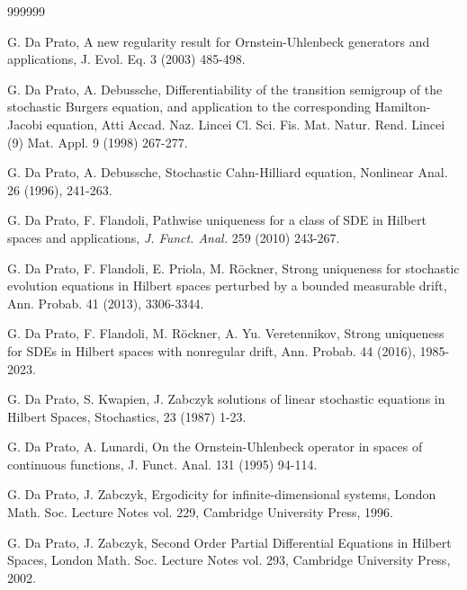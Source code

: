 \documentclass[preprint]{imsart}
\begin{document}
\begin{thebibliography}  {999999}
{%
 

 G. Da Prato, A new regularity result for Ornstein-Uhlenbeck generators and applications, J. Evol. Eq. 3 (2003) 485-498. 


 {  G. Da Prato, A. Debussche,
Differentiability of the transition semigroup of the stochastic Burgers equation, and application to the corresponding Hamilton-Jacobi equation,
 Atti Accad. Naz. Lincei Cl. Sci. Fis. Mat. Natur. Rend. Lincei (9) Mat. Appl. 9 (1998)  267-277.}


 G. Da Prato, A. Debussche, Stochastic Cahn-Hilliard equation, Nonlinear Anal.
26 (1996), 241-263.



 G. Da Prato, F. Flandoli, Pathwise uniqueness for a class of SDE 
in
Hilbert spaces and applications, \textit{J. Funct. Anal.} 259 
(2010) 243-267.


  G. Da Prato, F. Flandoli, E. Priola, M. R\"ockner,  Strong uniqueness for stochastic evolution equations in Hilbert spaces perturbed by a bounded measurable drift, Ann. Probab. 41 (2013), 3306-3344. 


 
 
  G.  Da Prato, F. Flandoli, M. R\"ockner, A. Yu. Veretennikov,  Strong uniqueness for SDEs in Hilbert spaces with nonregular drift, Ann. Probab. 44 (2016), 1985-2023. 


 G. Da Prato, S. Kwapien, J. Zabczyk   %
solutions of linear stochastic equations in Hilbert Spaces, Stochastics, 23 (1987) 1-23.


  G.  Da Prato, A.  Lunardi, 
 {On the Ornstein-Uhlenbeck operator
 in spaces of continuous functions}, {J. Funct.
 Anal.} {  131} (1995) 94-114.

 



 
 
  



 {  G. Da Prato, J. Zabczyk,  Ergodicity for infinite-dimensional systems,  London Math. Soc. Lecture Notes
vol. 229, Cambridge University Press,  1996.
}

 
  G. Da Prato, J.
 Zabczyk, Second Order Partial Differential
Equations in Hilbert Spaces, London Math. Soc. Lecture Notes
vol. 293, Cambridge University Press,  2002.
 
}
\end{thebibliography}
\end{document}
